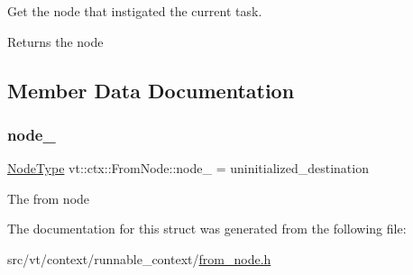 Get the node that instigated the current task. 

\begin{DoxyReturn}{Returns}
the node 
\end{DoxyReturn}


\subsection{Member Data Documentation}
\mbox{\label{structvt_1_1ctx_1_1_from_node_a9a94ab38bc3cd472de9d564adbd91eca}} 
\subsubsection{\texorpdfstring{node\+\_\+}{node\_}}
{\footnotesize\ttfamily \hyperlink{namespacevt_a866da9d0efc19c0a1ce79e9e492f47e2}{Node\+Type} vt\+::ctx\+::\+From\+Node\+::node\+\_\+ = uninitialized\+\_\+destination\hspace{0.3cm}{\ttfamily [private]}}

The from node 

The documentation for this struct was generated from the following file\+:\begin{DoxyCompactItemize}
\item 
src/vt/context/runnable\+\_\+context/\hyperlink{from__node_8h}{from\+\_\+node.\+h}\end{DoxyCompactItemize}
